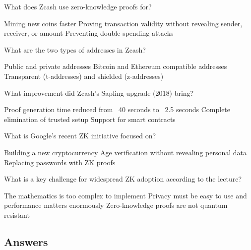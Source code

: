 \documentclass[10pt,a4paper,american]{exam}
\begin{document}
\begin{questions}
	\question What does Zcash use zero-knowledge proofs for?
	\begin{randomizechoices}
		\choice Mining new coins faster
		\CorrectChoice Proving transaction validity without revealing sender, receiver, or amount
		\choice Preventing double spending attacks
	\end{randomizechoices}

	\question What are the two types of addresses in Zcash?
	\begin{randomizechoices}
		\choice Public and private addresses
		\choice Bitcoin and Ethereum compatible addresses
		\CorrectChoice Transparent (t-addresses) and shielded (z-addresses)
	\end{randomizechoices}

	\question What improvement did Zcash's Sapling upgrade (2018) bring?
	\begin{randomizechoices}
		\CorrectChoice Proof generation time reduced from ~40 seconds to ~2.5 seconds
		\choice Complete elimination of trusted setup
		\choice Support for smart contracts
	\end{randomizechoices}

	\question What is Google's recent ZK initiative focused on?
	\begin{randomizechoices}
		\choice Building a new cryptocurrency
		\CorrectChoice Age verification without revealing personal data
		\choice Replacing passwords with ZK proofs
	\end{randomizechoices}

	\question What is a key challenge for widespread ZK adoption according to the lecture?
	\begin{randomizechoices}
		\choice The mathematics is too complex to implement
		\CorrectChoice Privacy must be easy to use and performance matters enormously
		\choice Zero-knowledge proofs are not quantum resistant
	\end{randomizechoices}

\end{questions}

\clearpage

\subsection*{Answers}
\printkeytable
\end{document}
